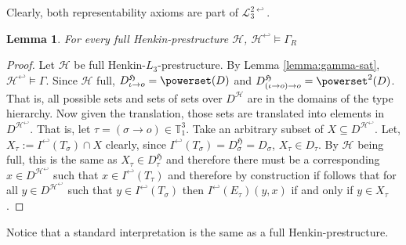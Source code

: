 \documentclass[11pt,a4paper]{article}
\newtheorem{lemma}[theorem]{Lemma}
\newcommand{\tofo}{\hookleftarrow}
\newcommand{\os}{\iota \to o}
\newcommand{\ot}{(\iota \to o)\to o}
\begin{document}
Clearly, both representability axioms are part of $\mathcal{L}_3^{2\tofo}$.

\begin{lemma}
\label{lemma:gammaR-sat}
For every full Henkin-prestructure $\mathcal{H}$, $\mathcal{H}^{\tofo} \models \Gamma_R$
\end{lemma}
\begin{proof}
Let $\mathcal{H}$ be full Henkin-$L_3$-prestructure. By Lemma \ref{lemma:gamma-sat}, $\mathcal{H}^{\tofo} \models \Gamma$. Since $\mathcal{H}$ full, $D_{\os}^{\mathfrak{H}}=\powerset(D)$ and $D_{\ot}^{\mathfrak{H}}=\powerset^2(D)$. That is, all possible sets and sets of sets over $D^{\mathcal{H}}$ are in the domains of the type hierarchy. Now given the translation, those sets are translated into elements in $D^{\mathcal{H}^{\tofo}}$. That is, let $\tau=(\sigma \to o) \in \mathbb{T}_1^3$. Take an arbitrary subset of $X \subseteq D^{\mathcal{H}^{\tofo}}$. Let, $X_{\tau}:= I^{\tofo}(T_{\sigma})\cap X$ clearly, since $ I^{\tofo}(T_{\sigma})=D_{\sigma}^{\mathfrak{H}}=D_{\sigma}$, $X_{\tau} \in D_{\tau}$. By $\mathcal{H}$ being full, this is the same as $X_{\tau} \in D_{\tau}^{\mathfrak{H}}$ and therefore there must be a corresponding $x \in D^{\mathcal{H}^{\tofo}}$ such that $x \in I^{\tofo}(T_{\tau})$ and therefore by construction if follows that for all $y \in D^{\mathcal{H}^{\tofo}}$ such that  $y \in I^{\tofo}(T_{\sigma})$ then $I^{\tofo}(E_{\tau})(y,x)$ if and only if $y \in X_{\tau}$.
\end{proof}

Notice that  a standard interpretation is the same as a full Henkin-prestructure.
\end{document}
